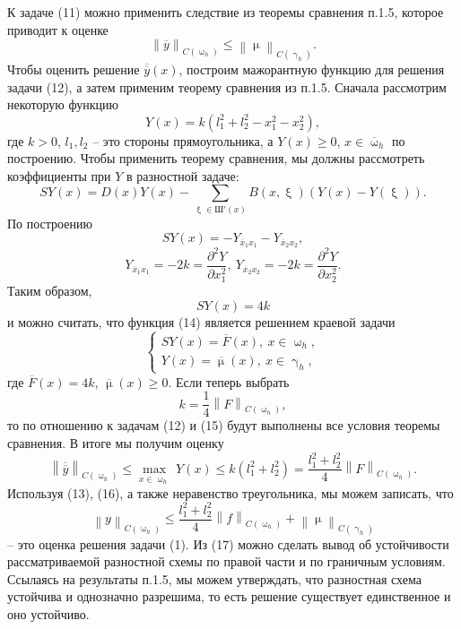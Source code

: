 \documentclass[a4paper, 12pt]{report}
\numberwithin{equation}{section}
\newcommand{\ol}{\overline}
\renewcommand{\leq}{\leqslant}
\renewcommand{\geq}{\geqslant}
\renewcommand{\gamma}{\upgamma}
\renewcommand{\mu}{\upmu}
\renewcommand{\omega}{\upomega}
\renewcommand{\xi}{\upxi}
\renewcommand{\d}{\partial}
\newcommand\Norm[1]{\left\| #1 \right\|}
\begin{document}
	К задаче (11) можно применить следствие из теоремы сравнения п.1.5, которое приводит к оценке 
	\begin{equation}
		\Norm{\ol y}_{C(\omega_h)}\leq \Norm{\mu}_{C(\gamma_h)}.
	\end{equation}
	Чтобы оценить решение $\ol {\ol y}(x)$, построим мажорантную функцию для решения задачи (12), а затем применим теорему сравнения из п.1.5. Сначала рассмотрим некоторую функцию \begin{equation}
		Y(x) = k(l_1^2 + l_2^2 - x_1^2 - x_2^2),
	\end{equation}
	где $k>0$, $l_1,l_2$ -- это стороны прямоугольника, а $Y(x)\geq 0$, $x \in \ol \omega_h$ по построению. Чтобы применить теорему сравнения, мы должны рассмотреть коэффициенты при $Y$ в разностной задаче:
	$$SY(x) = D(x)Y(x) - \sum_{\xi \in \text{Ш}'(x)} B(x,\xi)(Y(x) - Y(\xi)).$$
	По построению
	$$SY(x) = - Y_{\ol x_1 x_1} - Y_{\ol x_2 x_2},$$
	$$Y_{\ol x_1 x_1}= -2 k = \dfrac{\d ^2 Y}{\d x_1^2},\ Y_{\ol x_2 x_2}= -2 k = \dfrac{\d ^2 Y}{\d x_2^2}.$$
	Таким образом, 
	$$SY(x) = 4k$$
	и можно считать, что функция (14) является решением краевой задачи \begin{equation}
		\begin{cases}
		SY(x) = \ol F(x),\ x \in \omega_h,\\
		Y(x) = \ol \mu(x),\ x \in \gamma_h,
	\end{cases}
	\end{equation}
	где $\ol F(x) = 4k$, $\ol \mu(x) \geq 0$. Если теперь выбрать $$k = \dfrac{1}{4}\Norm{F}_{C(\omega_h)},$$
	то по отношению к задачам (12) и (15) будут выполнены все условия теоремы сравнения. В итоге мы получим оценку 
	\begin{equation}
		\Norm{\ol{\ol y}}_{C(\omega_h)} \leq \underset{x \in \ol\omega_h}{\max}\ Y(x)\leq k(l_1^2 + l_2^2) = \dfrac{l_1^2 + l_2^2}{4}\Norm{F}_{C(\omega_h)}.
	\end{equation}
	Используя (13), (16), а также неравенство треугольника, мы можем записать, что
	\begin{equation}
		\Norm{y}_{C(\omega_h)} \leq \dfrac{l_1^2 + l_2^2}{4}\Norm{f}_{C(\omega_h)} + \Norm{\mu}_{C(\gamma_h)}
	\end{equation} -- это оценка решения задачи (1). Из (17) можно сделать вывод об устойчивости рассматриваемой разностной схемы по правой части и по граничным условиям. Ссылаясь на результаты п.1.5, мы можем утверждать, что разностная схема устойчива и однозначно разрешима, то есть решение существует единственное и оно устойчиво.\\\\
\end{document}
